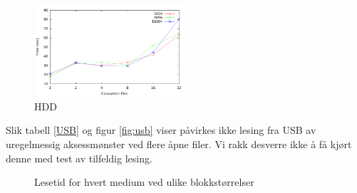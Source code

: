 \documentclass[titlepage]{article}
\begin{document}
\begin{figure}%
  \caption{HDD}
  \label{fig:hdd}
  \centering
  \includegraphics[width=0.5\textwidth]{res/result-hdd}
\end{figure}

Slik tabell \ref{USB} og figur \ref{fig:usb} viser påvirkes ikke
lesing fra USB av uregelmessig aksessmønster ved flere åpne filer. Vi
rakk desverre ikke å få kjørt denne med test av tilfeldig lesing.

\begin{figure}%
  \centering
  \caption{Lesetid for hvert medium ved ulike blokkstørrelser}
  \label{fig:blocksizes}
\end{figure}
\end{document}
